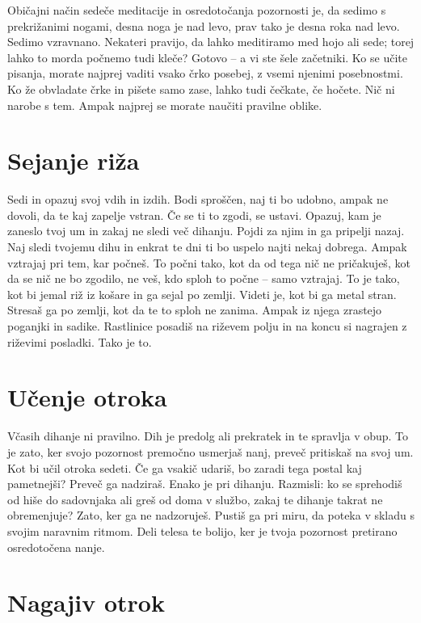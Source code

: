 Običajni način sedeče meditacije in osredotočanja pozornosti je, da sedimo s prekrižanimi nogami, desna noga je nad levo, prav tako je desna roka nad levo. Sedimo vzravnano. Nekateri pravijo, da lahko meditiramo med hojo ali sede; torej lahko to morda počnemo tudi kleče? Gotovo – a vi ste šele začetniki. Ko se učite pisanja, morate najprej vaditi vsako črko posebej, z vsemi njenimi posebnostmi. Ko že obvladate črke in pišete samo zase, lahko tudi čečkate, če hočete. Nič ni narobe s tem. Ampak najprej se morate naučiti pravilne oblike.

\section{Sejanje riža}

Sedi in opazuj svoj vdih in izdih. Bodi sproščen, naj ti bo udobno, ampak ne dovoli, da te kaj zapelje vstran. Če se ti to zgodi, se ustavi. Opazuj, kam je zaneslo tvoj um in zakaj ne sledi več dihanju. Pojdi za njim in ga pripelji nazaj. Naj sledi tvojemu dihu in enkrat te dni ti bo uspelo najti nekaj dobrega. Ampak vztrajaj pri tem, kar počneš. To počni tako, kot da od tega nič ne pričakuješ, kot da se nič ne bo zgodilo, ne veš, kdo sploh to počne – samo vztrajaj. To je tako, kot bi jemal riž iz košare in ga sejal po zemlji. Videti je, kot bi ga metal stran. Stresaš ga po zemlji, kot da te to sploh ne zanima. Ampak iz njega zrastejo poganjki in sadike. Rastlinice posadiš na riževem polju in na koncu si nagrajen z riževimi posladki. Tako je to.

\section{Učenje otroka}

Včasih dihanje ni pravilno. Dih je predolg ali prekratek in te spravlja v obup. To je zato, ker svojo pozornost premočno usmerjaš nanj, preveč pritiskaš na svoj um. Kot bi učil otroka sedeti. Če ga vsakič udariš, bo zaradi tega postal kaj pametnejši? Preveč ga nadziraš. Enako je pri dihanju. Razmisli: ko se sprehodiš od hiše do sadovnjaka ali greš od doma v službo, zakaj te dihanje takrat ne obremenjuje? Zato, ker ga ne nadzoruješ. Pustiš ga pri miru, da poteka v skladu s svojim naravnim ritmom. Deli telesa te bolijo, ker je tvoja pozornost pretirano osredotočena nanje.

\section{Nagajiv otrok}


